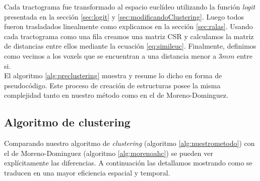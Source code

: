 Cada tractograma fue transformado al espacio eucl\'ideo utilizando la 
funci\'on \textit{logit} presentada en la secci\'on \ref{sec:logit} y 
\ref{sec:modificandoClustering}. Luego todos fueron trasladados linealmente
como explicamos en la secci\'on \ref{sec:ralas}. Usando cada tractograma
como una fila creamos una matriz CSR y calculamos la matriz de distancias
entre ellos mediante la ecuaci\'on \ref{eq:simileuc}. Finalmente,
definimos como vecinos a los voxels que se encuentran a una distancia
menor a $3mm$ entre si. \\  

El algoritmo \ref{alg:preclustering} muestra y resume lo dicho en forma de
pseudoc\'odigo. Este proceso de creaci\'on de estructuras posee la misma
complejidad tanto en nuestro m\'etodo como en el de Moreno-Dominguez. \\

\subsection{Algoritmo de clustering}
\label{sec:nuestro_clustering}

Comparando nuestro algoritmo de \textit{clustering} 
(algoritmo \ref{alg:nuestrometodo}) con el de Moreno-Dominguez 
(algoritmo \ref{alg:morenoahc}) se pueden ver expl\'icitamente las
diferencias. A continuaci\'on las detallamos mostrando como se traducen
en una mayor eficiencia espacial y temporal. \\

\settowidth{}
\addtolength\mylen{\parindent}

